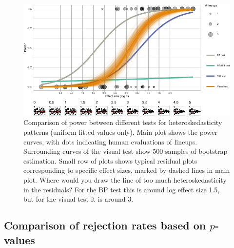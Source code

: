 \documentclass[]{interact}
\theoremstyle{plain}%
\theoremstyle{definition}
\theoremstyle{remark}
\begin{document}
\begin{figure}

{\centering \includegraphics[width=1\linewidth]{paper_comparison_files/figure-latex/heterpower-1} 

}

\caption{Comparison of power between different tests for heteroskedasticity patterns (uniform fitted values only). Main plot shows the power curves, with dots indicating human evaluations of lineups. Surrounding curves of the visual test show 500 samples of bootstrap estimation. Small row of plots shows typical residual plots corresponding to specific effect sizes, marked by dashed lines in main plot. Where would you draw the line of too much heteroskedasticity in the residuals? For the BP test this is around log effect size 1.5, but for the visual test it is around 3.}\label{fig:heterpower}
\end{figure}

\hypertarget{comparison-of-rejection-rates-based-on-p-values}{%
\subsection{\texorpdfstring{Comparison of rejection rates based on
\(p\)-values}{Comparison of rejection rates based on p-values}}\label{comparison-of-rejection-rates-based-on-p-values}}
\end{document}
